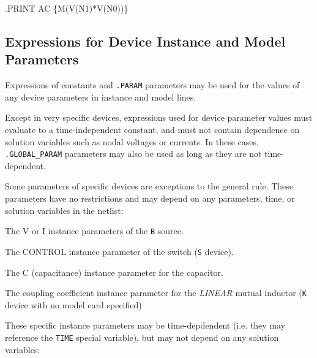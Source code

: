 \begin{vquote}
.PRINT AC  \{M(V(N1)*V(N0))\}
\end{vquote}

\subsection{Expressions for Device Instance and Model Parameters}

Expressions of constants and \texttt{.PARAM} parameters may be used
for the values of any device parameters in instance and model lines.

Except in very specific devices, expressions used for device parameter
values must evaluate to a time-independent constant, and must not
contain dependence on solution variables such as nodal voltages or
currents.  In these cases, \texttt{.GLOBAL\_PARAM} parameters may also
be used as long as they are not time-dependent.

\begin{centering}
\end{centering}

Some parameters of specific devices are exceptions to the general
rule.  These parameters have no restrictions and may depend on any
parameters, time, or solution variables in the
netlist:
\begin{XyceItemize}
\item The \textrm{V} or \textrm{I} instance parameters of the
  \texttt{B} source.
\item The \textrm{CONTROL} instance parameter of the switch (\texttt{S}
  device).
\item The \textrm{C} (capacitance) instance parameter for the capacitor.
\item The coupling coefficient instance parameter for the {\em LINEAR}
  mutual inductor (\texttt{K} device with no model card specified)
\end{XyceItemize}

These specific instance parameters may be time-depdendent (i.e. they
may reference the \texttt{TIME} special variable), but may not depend
on any solution variables:

